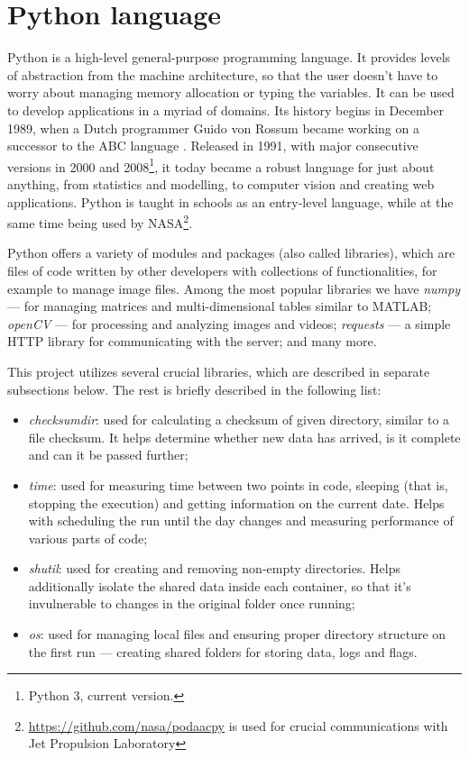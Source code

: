 \section{Python language}
Python is a high-level general-purpose programming language. It provides levels of abstraction from the machine architecture, so that the user doesn't have to worry about managing memory allocation or typing the variables. It can be used to develop applications in a myriad of domains. Its history begins in December 1989, when a Dutch programmer Guido von Rossum became working on a successor to the ABC language \cite{thePython}. Released in 1991, with major consecutive versions in 2000 and 2008\footnote{Python 3, current version.}, it today became a robust language for just about anything, from statistics and modelling, to computer vision and creating web applications. Python is taught in schools as an entry-level language, while at the same time being used by NASA\footnote{\url{https://github.com/nasa/podaacpy} is used for crucial communications with Jet Propulsion Laboratory}. \par
Python offers a variety of modules and packages (also called libraries), which are files of code written by other developers with collections of functionalities, for example to manage image files. Among the most popular libraries we have \textit{numpy} --- for managing matrices and multi-dimensional tables similar to MATLAB; \textit{openCV} --- for processing and analyzing images and videos; \textit{requests} --- a simple HTTP library for communicating with the server; and many more. \par
This project utilizes several crucial libraries, which are described in separate subsections below. The rest is briefly described in the following list:

\begin{itemize}
    \item \textit{checksumdir}: used for calculating a checksum of given directory, similar to a file checksum. It helps determine whether new data has arrived, is it complete and can it be passed further;
    \item \textit{time}: used for measuring time between two points in code, sleeping (that is, stopping the execution) and getting information on the current date. Helps with scheduling the run until the day changes and measuring performance of various parts of code;
    \item \textit{shutil}: used for creating and removing non-empty directories. Helps additionally isolate the shared data inside each container, so that it's invulnerable to changes in the original folder once running;
    \item \textit{os}: used for managing local files and ensuring proper directory structure on the first run --- creating shared folders for storing data, logs and flags.
\end{itemize}

